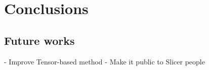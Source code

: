 \chapter{Conclusions}


\section{Future works}

- Improve Tensor-based method
- Make it public to Slicer people
